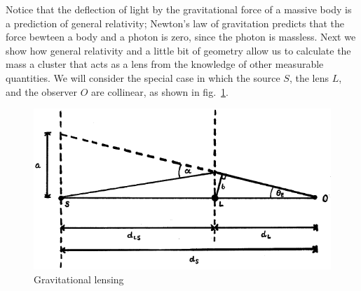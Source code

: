 \documentclass[11pt, a4paper,oneside,openright]{book}
\numberwithin{equation}{section}
\begin{document}
Notice that the deflection of light by the gravitational force of a massive body is a prediction of general relativity; Newton's law of gravitation predicts that the force bewteen a body and a photon is zero, since the photon is massless. Next we show how general relativity and a little bit of geometry allow us to calculate the mass a cluster that acts as a lens from the knowledge of other measurable quantities. We will consider the special case in which the source $S$, the lens $L$, and the observer $O$ are collinear, as shown in fig.\ \ref{fig:lec10_8}.
\begin{figure}[ht]
\begin{center}
\includegraphics[scale=0.6]{Draw/lec10_8.png}
\end{center}
\caption{Gravitational lensing}
\label{fig:lec10_8}
\end{figure}
\end{document}
